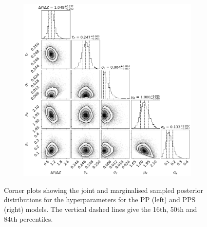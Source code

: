 \documentclass[fleqn,usenatbib]{mnras}
\begin{document}
\begin{figure}
\begin{subfigure}[b]{.5\linewidth}
        \includegraphics[width=\textwidth]{figures/corner_plot_pps.png}
    \end{subfigure}
    \caption{Corner plots showing the joint and marginalised sampled posterior distributions for the hyperparameters for the PP (left) and PPS (right) models. The vertical dashed lines give the 16th, 50th and 84th percentiles.}
    \label{fig:corners-pp}
\end{figure} 
\end{document}
